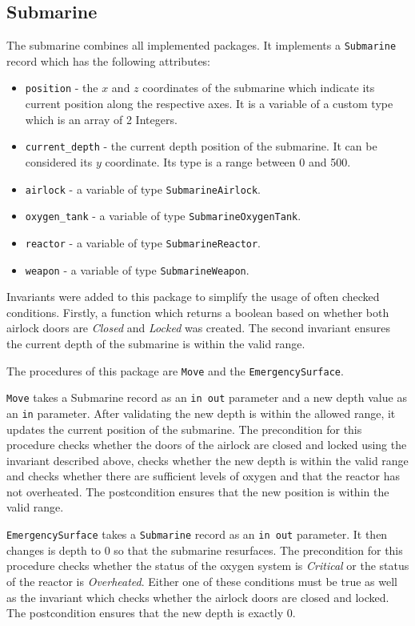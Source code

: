 \documentclass{llncs}
\begin{document}
\subsection{Submarine}
The submarine combines all implemented packages. It implements a \texttt{Submarine} record which has the following attributes:
\begin{itemize}
	\item \texttt{position} - the $x$ and $z$ coordinates of the submarine which indicate its current position along the respective axes. It is a variable of a custom type which is an array of 2 Integers.
	\item \texttt{current\_depth} - the current depth position of the submarine. It can be considered its $y$ coordinate. Its type is a range between 0 and 500.
	\item \texttt{airlock} - a variable of type \texttt{SubmarineAirlock}.
	\item \texttt{oxygen\_tank} - a variable of type \texttt{SubmarineOxygenTank}.
	\item \texttt{reactor} - a variable of type \texttt{SubmarineReactor}.
	\item \texttt{weapon} - a variable of type \texttt{SubmarineWeapon}.
\end{itemize}

Invariants were added to this package to simplify the usage of often checked conditions. Firstly, a function which returns a boolean based on whether both airlock doors are \textit{Closed} and \textit{Locked} was created. The second invariant ensures  the current depth of the submarine is within the valid range.

The procedures of this package are \texttt{Move} and the \texttt{EmergencySurface}. 

\texttt{Move} takes a Submarine record as an \texttt{in out} parameter and a new depth value as an \texttt{in} parameter. After validating the new depth is within the allowed range, it updates the current position of the submarine. The precondition for this procedure checks whether the doors of the airlock are closed and locked using the invariant described above, checks whether the new depth is within the valid range and checks whether there are sufficient levels of oxygen and that the reactor has not overheated. The postcondition ensures that the new position is within the valid range.

\texttt{EmergencySurface} takes a \texttt{Submarine} record as an \texttt{in out} parameter. It then changes is depth to 0 so that the submarine resurfaces. The precondition for this procedure checks whether the status of the oxygen system is \textit{Critical} or the status of the reactor is \textit{Overheated}. Either one of these conditions must be true as well as the invariant which checks whether the airlock doors are closed and locked. The postcondition ensures that the new depth is exactly 0. 
\end{document}
